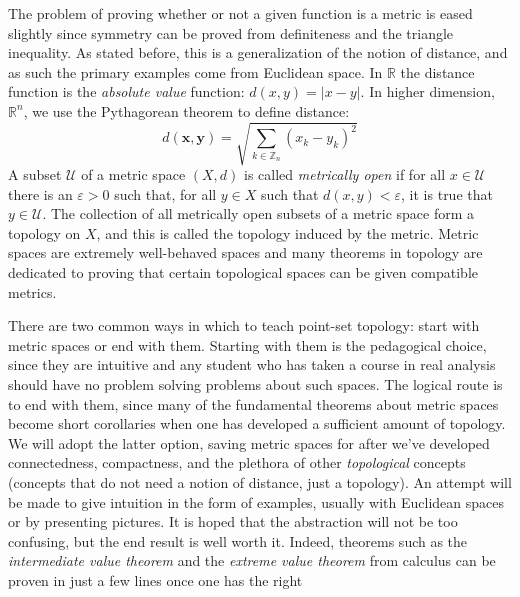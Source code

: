     The problem of proving whether or not a given function is a metric is eased
    slightly since symmetry can be proved from definiteness and the triangle
    inequality. As stated before, this is a generalization of the notion of
    distance, and as such the primary examples come from Euclidean space. In
    $\mathbb{R}$ the distance function is the \textit{absolute value} function:
    $d(x,y)=|x-y|$. In higher dimension, $\mathbb{R}^{n}$, we use the
    Pythagorean theorem to define distance:
    \begin{equation}
        d(\mathbf{x},\mathbf{y})
        =\sqrt{\sum_{k\in\mathbb{Z}_{n}}(x_{k}-y_{k})^{2}}
    \end{equation}
    A subset $\mathcal{U}$ of a metric space $(X,d)$ is called
    \textit{metrically open} if for all $x\in\mathcal{U}$ there is an
    $\varepsilon>0$ such that, for all $y\in{X}$ such that $d(x,y)<\varepsilon$,
    it is true that $y\in\mathcal{U}$. The collection of all metrically open
    subsets of a metric space form a topology on $X$, and this is called the
    topology induced by the metric. Metric
    spaces are extremely well-behaved spaces and many theorems in topology are
    dedicated to proving that certain topological spaces can be given
    compatible metrics.
    \par\hfill\par
    There are two common ways in which to teach point-set topology: start with
    metric spaces or end with them. Starting with them is the pedagogical
    choice, since they are intuitive and any student who has taken a course in
    real analysis should have no problem solving problems about such spaces. The
    logical route is to end with them, since many of the fundamental theorems
    about metric spaces become short corollaries when one has developed a
    sufficient amount of topology. We will adopt the latter option, saving
    metric spaces for after we've developed connectedness, compactness, and the
    plethora of other \textit{topological} concepts (concepts that do not need
    a notion of distance, just a topology). An attempt will be made to give
    intuition in the form of examples, usually with Euclidean spaces or by
    presenting pictures. It is hoped that the abstraction will not be too
    confusing, but the end result is well worth it. Indeed, theorems such as the
    \textit{intermediate value theorem} and the \textit{extreme value theorem}
    from calculus can be proven in just a few lines once one has the right
